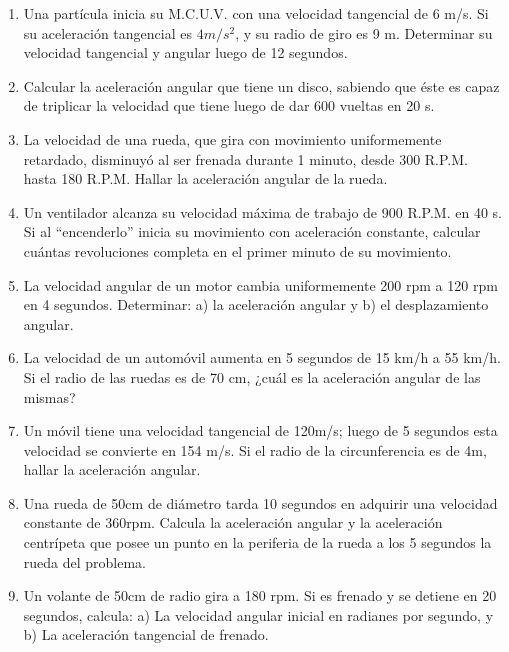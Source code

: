 \begin{enumerate}

\item Una partícula inicia su M.C.U.V. con una velocidad tangencial de 6 m/s. Si su aceleración tangencial es $4 m/s^2$, y su 
radio de giro es 9 m. Determinar su velocidad tangencial y angular luego de 12 segundos.

\item Calcular la aceleración angular que tiene un disco, sabiendo que éste es capaz de triplicar la velocidad que tiene luego de 
dar 600 vueltas en 20 s.

\item La velocidad de una rueda, que gira con movimiento uniformemente retardado, disminuyó al ser frenada durante 1 minuto, 
desde 
300 R.P.M. hasta 180 R.P.M. Hallar la aceleración angular de la rueda.

\item Un ventilador alcanza su velocidad máxima de trabajo de 900 R.P.M. en 40 s. Si al ``encenderlo'' inicia su movimiento con 
aceleración constante, calcular cuántas revoluciones completa en el primer minuto de su movimiento.

\item La velocidad angular de un motor cambia uniformemente
 200 rpm a 120 rpm en 4 segundos. Determinar: a) la aceleración 
angular y b) el
 desplazamiento angular.

\item  La velocidad de
 un automóvil aumenta en 5 segundos de 15 km/h a 55 km/h. Si el radio de las ruedas es de 70
 cm, ¿cuál es 
la aceleración angular de las mismas? 

\item Un móvil tiene una velocidad tangencial de 120m/s; luego de 5 segundos esta velocidad se convierte en 154 m/s. Si el radio 
de la circunferencia es de 4m, hallar la aceleración angular. 

\item Una rueda de 50cm de diámetro tarda 10 segundos en adquirir una velocidad constante de 360rpm. Calcula la aceleración 
angular y la aceleración centrípeta que posee un punto en la periferia de la rueda a los 5 segundos la rueda del problema.

\item Un volante de 50cm de radio gira a 180 rpm. Si es frenado y se detiene en 20 segundos, calcula: a) La velocidad angular 
inicial en radianes por segundo, y b) La aceleración tangencial de frenado.


\end{enumerate}
